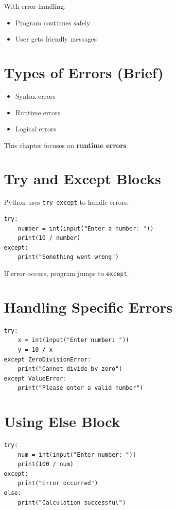 With error handling:
\begin{itemize}
    \item Program continues safely
    \item User gets friendly messages
\end{itemize}

\section{Types of Errors (Brief)}

\begin{itemize}
    \item Syntax errors
    \item Runtime errors
    \item Logical errors
\end{itemize}

This chapter focuses on \textbf{runtime errors}.

\section{Try and Except Blocks}

Python uses \texttt{try-except} to handle errors.

\begin{verbatim}
try:
    number = int(input("Enter a number: "))
    print(10 / number)
except:
    print("Something went wrong")
\end{verbatim}

If error occurs, program jumps to \texttt{except}.

\section{Handling Specific Errors}

\begin{verbatim}
try:
    x = int(input("Enter number: "))
    y = 10 / x
except ZeroDivisionError:
    print("Cannot divide by zero")
except ValueError:
    print("Please enter a valid number")
\end{verbatim}

\section{Using Else Block}

\begin{verbatim}
try:
    num = int(input("Enter number: "))
    print(100 / num)
except:
    print("Error occurred")
else:
    print("Calculation successful")
\end{verbatim}

